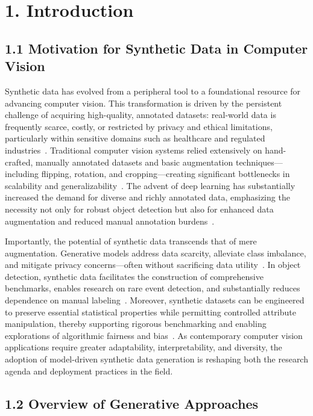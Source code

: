 \documentclass[11pt]{article}
\begin{document}
\section{1. Introduction}

\subsection{1.1 Motivation for Synthetic Data in Computer Vision}

Synthetic data has evolved from a peripheral tool to a foundational resource for advancing computer vision. This transformation is driven by the persistent challenge of acquiring high-quality, annotated datasets: real-world data is frequently scarce, costly, or restricted by privacy and ethical limitations, particularly within sensitive domains such as healthcare and regulated industries~\cite{ref12,ref21,ref22,ref33,ref35,ref43,ref87}. Traditional computer vision systems relied extensively on hand-crafted, manually annotated datasets and basic augmentation techniques—including flipping, rotation, and cropping—creating significant bottlenecks in scalability and generalizability~\cite{ref49,ref61,ref62,ref65}. The advent of deep learning has substantially increased the demand for diverse and richly annotated data, emphasizing the necessity not only for robust object detection but also for enhanced data augmentation and reduced manual annotation burdens~\cite{ref35,ref43,ref49,ref61,ref62,ref64,ref65}.

Importantly, the potential of synthetic data transcends that of mere augmentation. Generative models address data scarcity, alleviate class imbalance, and mitigate privacy concerns—often without sacrificing data utility~\cite{ref33,ref35,ref43}. In object detection, synthetic data facilitates the construction of comprehensive benchmarks, enables research on rare event detection, and substantially reduces dependence on manual labeling~\cite{ref49,ref61}. Moreover, synthetic datasets can be engineered to preserve essential statistical properties while permitting controlled attribute manipulation, thereby supporting rigorous benchmarking and enabling explorations of algorithmic fairness and bias~\cite{ref12,ref14}. As contemporary computer vision applications require greater adaptability, interpretability, and diversity, the adoption of model-driven synthetic data generation is reshaping both the research agenda and deployment practices in the field.

\subsection{1.2 Overview of Generative Approaches}
\end{document}

